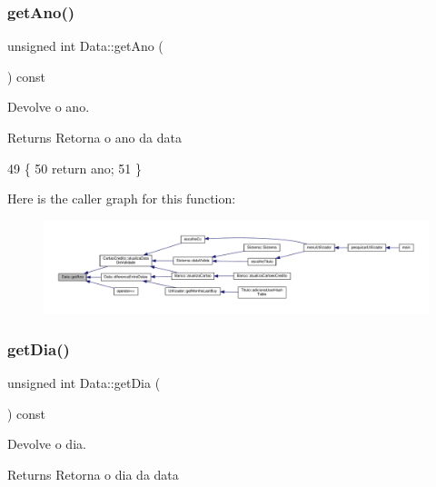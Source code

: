 \subsubsection{\texorpdfstring{get\+Ano()}{getAno()}}
{\footnotesize\ttfamily unsigned int Data\+::get\+Ano (\begin{DoxyParamCaption}{ }\end{DoxyParamCaption}) const}



Devolve o ano. 

\begin{DoxyReturn}{Returns}
Retorna o ano da data 
\end{DoxyReturn}

\begin{DoxyCode}
49                                 \{
50     \textcolor{keywordflow}{return} ano;
51 \}
\end{DoxyCode}
Here is the caller graph for this function\+:
\nopagebreak
\begin{figure}[H]
\begin{center}
\leavevmode
\includegraphics[width=350pt]{classData_ae19e0d5af87f94f2809ba52dae69e15b_icgraph}
\end{center}
\end{figure}
\mbox{\label{classData_a459536c9351759b5697ba25456d9bd70}} 
\subsubsection{\texorpdfstring{get\+Dia()}{getDia()}}
{\footnotesize\ttfamily unsigned int Data\+::get\+Dia (\begin{DoxyParamCaption}{ }\end{DoxyParamCaption}) const}



Devolve o dia. 

\begin{DoxyReturn}{Returns}
Retorna o dia da data 
\end{DoxyReturn}

